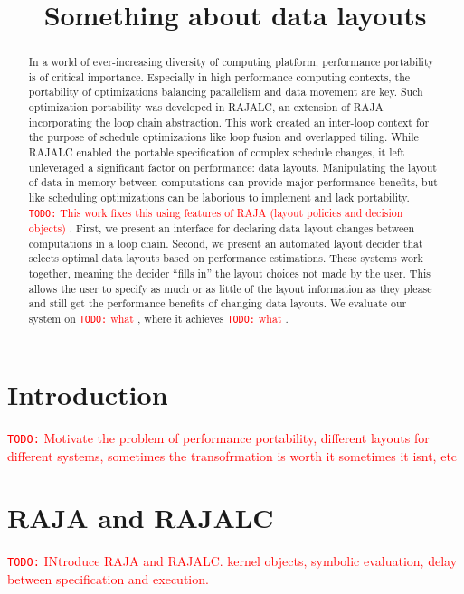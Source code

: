 \documentclass[sigconf, table]{acmart}
\title{Something about data layouts}
\newcommand{\todo}[1]{{\textcolor{red}{{\tt{TODO:}}\,\,#1 }}}
\begin{document}
\begin{abstract}
In a world of ever-increasing diversity of computing platform, performance portability is of critical importance. 
Especially in high performance computing contexts, the portability of optimizations balancing parallelism and data movement are key. 
Such optimization portability was developed in RAJALC, an extension of RAJA incorporating the loop chain abstraction.
This work created an inter-loop context for the purpose of schedule optimizations like loop fusion and overlapped tiling.
While RAJALC enabled the portable specification of complex schedule changes, it left unleveraged a significant factor on performance: data layouts.
Manipulating the layout of data in memory between computations can provide major performance benefits, but like scheduling optimizations can be laborious to implement and lack portability. 
\todo{This work fixes this using features of RAJA (layout policies and decision objects)}.
First, we present an interface for declaring data layout changes between computations in a loop chain. 
Second, we present an automated layout decider that selects optimal data layouts based on performance estimations.
These systems work together, meaning the decider \enquote{fills in} the layout choices not made by the user.
This allows the user to specify as much or as little of the layout information as they please and still get the performance benefits of changing data layouts.  
We evaluate our system on \todo{what}, where it achieves \todo{what}.
\end{abstract}

\maketitle

\section{Introduction}
\todo{Motivate the problem of performance portability, different layouts for different systems, sometimes the transofrmation is worth it sometimes it isnt, etc}

\section{RAJA and RAJALC}

\todo{INtroduce RAJA and RAJALC. kernel objects, symbolic evaluation, delay between specification and execution.}
\end{document}

